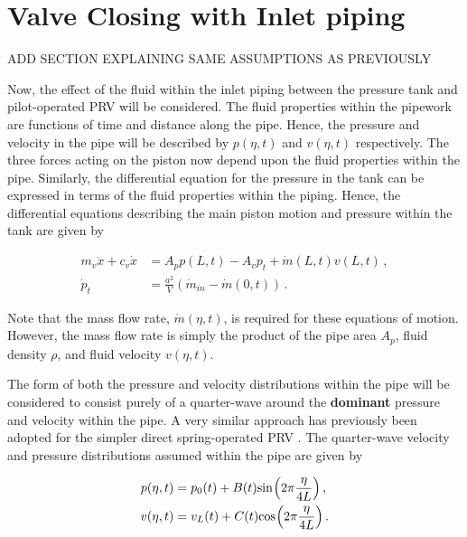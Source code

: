 \section{Valve Closing with Inlet piping}

ADD SECTION EXPLAINING SAME ASSUMPTIONS AS PREVIOUSLY

Now, the effect of the fluid within the inlet piping between the pressure tank and pilot-operated PRV will be considered. The fluid properties within the pipework are functions of time and distance along the pipe. Hence, the pressure and velocity in the pipe will be described by $p(\eta,t)$ and $v(\eta,t)$ respectively. The three forces acting on the piston now depend upon the fluid properties within the pipe. Similarly, the differential equation for the pressure in the tank can be expressed in terms of the fluid properties within the piping. Hence, the differential equations describing the main piston motion and pressure within the tank are given by

\begin{equation} \label{eq: ValveODEsPipe}
\begin{split}
    m_v \ddot{x} + c_v \dot{x} &= A_p p(L,t) - A_v p_t + \dot{m}(L,t)
    v(L,t) %
    \, , \\
    \dot{p}_t &= \frac{a^2}{V} \left( \dot{m}_{in} - \dot{m}(0,t) \right) \, .
\end{split}
\end{equation}

Note that the mass flow rate, $\dot{m}(\eta,t)$, is required for these equations of motion. However, the mass flow rate is simply the product of the pipe area $A_p$, fluid density $\rho$, and fluid velocity $v(\eta,t)$.

The form of both the pressure and velocity distributions within the pipe will be considered to consist purely of a quarter-wave around the \textbf{dominant} pressure and velocity within the pipe. A very similar approach has previously been adopted for the simpler direct spring-operated PRV \cite{Hos2016DynamicService,Hos2015ModelPipe}. The quarter-wave velocity and pressure distributions assumed within the pipe are given by

\begin{equation} \label{eq: PressVelDist}
\begin{split}
    p(\eta,t) &= p_0(t) + B(t) \fun{sin}{2\pi \frac{\eta}{4L}} \, ,\\
    v(\eta,t) &= v_L(t) + C(t) \fun{cos}{2\pi \frac{\eta}{4L}} \, .
\end{split}
\end{equation}


